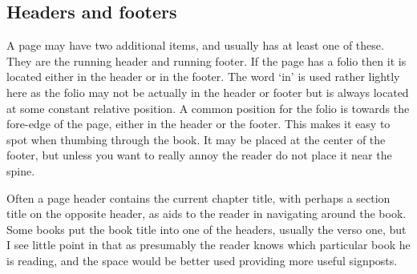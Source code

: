 





\subsection{Headers and footers}
A page may have two additional items, and usually has at least one of these. They are the
running header and running footer. If the page has a folio then it is located either in the
header or in the footer. The word ‘in’ is used rather lightly here as the folio may not be
actually in the header or footer but is always located at some constant relative position. A
common position for the folio is towards the fore-edge of the page, either in the header or
the footer. This makes it easy to spot when thumbing through the book. It may be placed
at the center of the footer, but unless you want to really annoy the reader do not place it
near the spine.

Often a page header contains the current chapter title, with perhaps a section title on
the opposite header, as aids to the reader in navigating around the book. Some books put
the book title into one of the headers, usually the verso one, but I see little point in that as
presumably the reader knows which particular book he is reading, and the space would
be better used providing more useful signposts.

